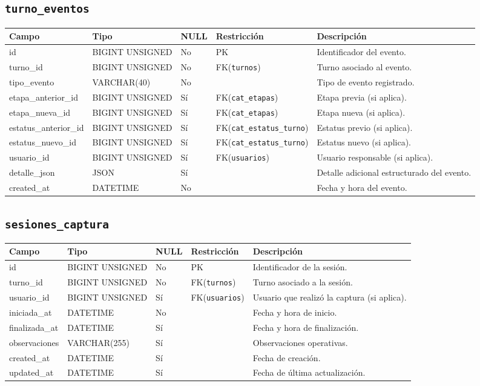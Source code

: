 \documentclass[12pt,a4paper]{article}
\begin{document}
\subsection{\texttt{turno\_eventos}}
\begin{longtable}{L{3.2cm} L{3.2cm} C{1.2cm} L{2.8cm} L{5.0cm}}
\toprule
\textbf{Campo} & \textbf{Tipo} & \textbf{NULL} & \textbf{Restricción} & \textbf{Descripción} \\
\midrule
\endhead
id & BIGINT UNSIGNED & No & PK & Identificador del evento. \\
turno\_id & BIGINT UNSIGNED & No & FK(\texttt{turnos}) & Turno asociado al evento. \\
tipo\_evento & VARCHAR(40) & No &  & Tipo de evento registrado. \\
etapa\_anterior\_id & BIGINT UNSIGNED & Sí & FK(\texttt{cat\_etapas}) & Etapa previa (si aplica). \\
etapa\_nueva\_id & BIGINT UNSIGNED & Sí & FK(\texttt{cat\_etapas}) & Etapa nueva (si aplica). \\
estatus\_anterior\_id & BIGINT UNSIGNED & Sí & FK(\texttt{cat\_estatus\_turno}) & Estatus previo (si aplica). \\
estatus\_nuevo\_id & BIGINT UNSIGNED & Sí & FK(\texttt{cat\_estatus\_turno}) & Estatus nuevo (si aplica). \\
usuario\_id & BIGINT UNSIGNED & Sí & FK(\texttt{usuarios}) & Usuario responsable (si aplica). \\
detalle\_json & JSON & Sí &  & Detalle adicional estructurado del evento. \\
created\_at & DATETIME & No &  & Fecha y hora del evento. \\
\bottomrule
\end{longtable}

\subsection{\texttt{sesiones\_captura}}
\begin{longtable}{L{3.2cm} L{3.2cm} C{1.2cm} L{2.8cm} L{5.0cm}}
\toprule
\textbf{Campo} & \textbf{Tipo} & \textbf{NULL} & \textbf{Restricción} & \textbf{Descripción} \\
\midrule
\endhead
id & BIGINT UNSIGNED & No & PK & Identificador de la sesión. \\
turno\_id & BIGINT UNSIGNED & No & FK(\texttt{turnos}) & Turno asociado a la sesión. \\
usuario\_id & BIGINT UNSIGNED & Sí & FK(\texttt{usuarios}) & Usuario que realizó la captura (si aplica). \\
iniciada\_at & DATETIME & No &  & Fecha y hora de inicio. \\
finalizada\_at & DATETIME & Sí &  & Fecha y hora de finalización. \\
observaciones & VARCHAR(255) & Sí &  & Observaciones operativas. \\
created\_at & DATETIME & Sí &  & Fecha de creación. \\
updated\_at & DATETIME & Sí &  & Fecha de última actualización. \\
\bottomrule
\end{longtable}
\end{document}
